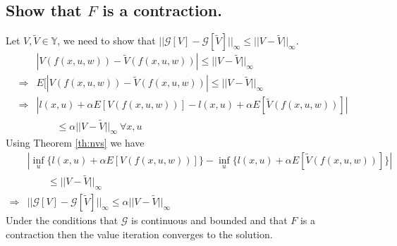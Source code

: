 \subsection{Show that $F$ is a contraction.}
\label{sec:showfcontraction}
Let $V,\tilde{V}\in\mathbb{Y}$, we need to show that $||\mathcal{G}[V]-\mathcal{G}[\tilde{V}]||_\infty \leq ||V-\tilde{V}||_\infty$.
\begin{align*}
&|V(f(x,u,w)) - \tilde{V}(f(x,u,w))| \leq ||V-\tilde{V}||_\infty \\
\Rightarrow &E[|V(f(x,u,w)) - \tilde{V}(f(x,u,w))| \leq ||V-\tilde{V}||_\infty \\
\Rightarrow &|l(x,u)+\alpha E[V(f(x,u,w))] - l(x,u)+\alpha E[\tilde{V}(f(x,u,w))]| \\
&\qquad \leq \alpha||V-\tilde{V}||_\infty ~\forall x,u
\end{align*}
Using Theorem \ref{th:nvs} we have
\begin{align*}
&|\inf_u\{l(x,u)+\alpha E[V(f(x,u,w))]\} - \inf_u\{l(x,u)+\alpha E[\tilde{V}(f(x,u,w))]\}| \\
&\qquad \leq ||V-\tilde{V}||_\infty \\
\Rightarrow &||\mathcal{G}[V]-\mathcal{G}[\tilde{V}]||_\infty \leq \alpha||V-\tilde{V}||_\infty
\end{align*}
Under the conditions that $\mathcal{G}$ is continuous and bounded and that $F$ is a contraction then the value iteration converges to the solution.


